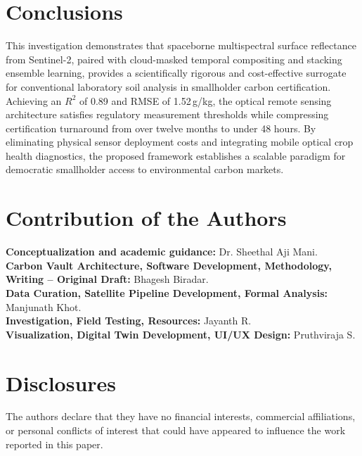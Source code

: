 \documentclass[a4paper,10pt]{article}
\begin{document}
\section{Conclusions}

This investigation demonstrates that spaceborne multispectral surface reflectance from Sentinel-2, paired with cloud-masked temporal compositing and stacking ensemble learning, provides a scientifically rigorous and cost-effective surrogate for conventional laboratory soil analysis in smallholder carbon certification. Achieving an $R^2$ of 0.89 and RMSE of 1.52\,g/kg, the optical remote sensing architecture satisfies regulatory measurement thresholds while compressing certification turnaround from over twelve months to under 48 hours. By eliminating physical sensor deployment costs and integrating mobile optical crop health diagnostics, the proposed framework establishes a scalable paradigm for democratic smallholder access to environmental carbon markets.

\section{Contribution of the Authors}

\noindent \textbf{Conceptualization and academic guidance:} Dr. Sheethal Aji Mani. \\
\textbf{Carbon Vault Architecture, Software Development, Methodology, Writing -- Original Draft:} Bhagesh Biradar. \\
\textbf{Data Curation, Satellite Pipeline Development, Formal Analysis:} Manjunath Khot. \\
\textbf{Investigation, Field Testing, Resources:} Jayanth R. \\
\textbf{Visualization, Digital Twin Development, UI/UX Design:} Pruthviraja S.

\vspace{10pt}

\section*{Disclosures}

The authors declare that they have no financial interests, commercial affiliations, or personal conflicts of interest that could have appeared to influence the work reported in this paper.
\end{document}
